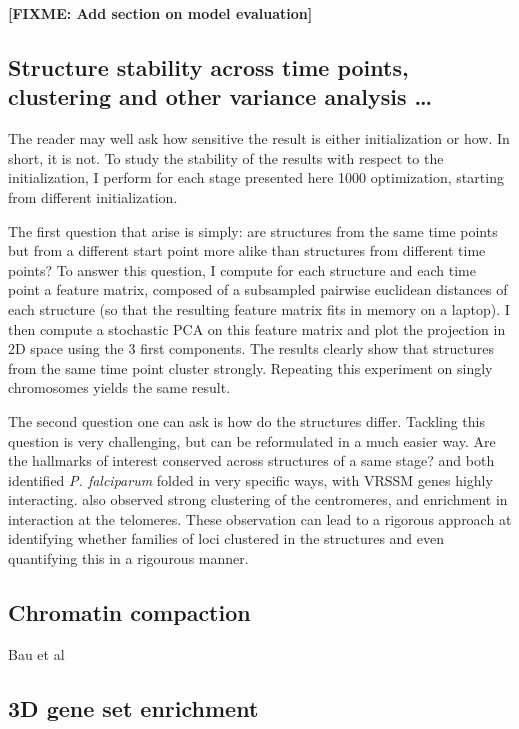 \documentclass[letterpaper,12pt]{article}
\newcommand{\fixme}[1]{\textbf{[FIXME: #1]}}
\begin{document}
\fixme{Add section on model evaluation}



\subsection*{Structure stability across time points, clustering and other
variance analysis \dots}

The reader may well ask how sensitive the result is either initialization or
how. In short, it is not. To study the stability of the results with respect
to the initialization, I perform for each stage presented here 1000
optimization, starting from different initialization. 

The first question that arise is simply: are structures from the same time
points but from a different start point more alike than structures from
different time points? To answer this question, I compute for each structure
and each time point a feature matrix, composed of a subsampled pairwise
euclidean distances of each structure (so that the resulting feature matrix
fits in memory on a laptop). I then compute a stochastic PCA on this feature
matrix and plot the projection in 2D space using the 3 first components. The
results clearly show that structures from the same time point cluster
strongly. Repeating this experiment on singly chromosomes yields the same
result.

The second question one can ask is how do the structures differ. Tackling this
question is very challenging, but can be reformulated in a much easier way.
Are the hallmarks of interest conserved across structures of a same stage?
\citet{ay:three-dimensional} and \citet{lemieux:genome-wide} both identified
{\em P. falciparum} folded in very specific ways, with VRSSM genes highly
interacting. \citet{ay:three-dimensional} also observed strong clustering of
the centromeres, and enrichment in interaction at the telomeres. These
observation can lead to a rigorous approach at identifying whether families
of loci clustered in the structures and even quantifying this in a rigourous
manner.

\subsection{Chromatin compaction}

Bau et al


\subsection*{3D gene set enrichment}
\end{document}

